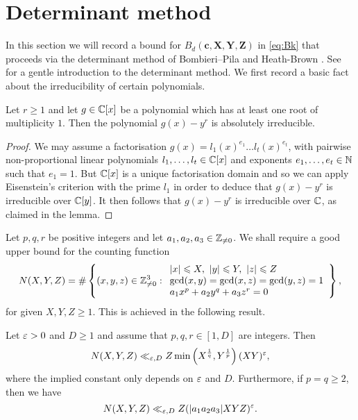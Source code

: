 \section{Determinant method}\label{s:det}

In this section we will record a bound for  $B_d(\mathbf{c},\mathbf{X},\mathbf{Y},\mathbf{Z})$  in  \eqref{eq:Bk} that proceeds via the determinant method of Bombieri--Pila \cite{bp} and Heath-Brown \cite{cime}. See \cite{bl} for a gentle introduction to the determinant method.
We first record a  basic fact about the irreducibility of certain polynomials.

\begin{lemma}\label{eis}
Let $r\geq 1$ and let $g\in \mathbb{C}[x]$ be a polynomial
which has  at least one root of multiplicity $1$.
Then the polynomial $g(x)-y^r$ is absolutely irreducible.
\end{lemma}

\begin{proof}
We may assume  a factorisation
 $g(x)=l_1(x)^{e_1}\dots l_t(x)^{e_t}$, with
pairwise non-proportional linear polynomials $l_1,\dots,l_t\in \mathbb{C}[x]$ and exponents $e_1,\dots,e_t\in \mathbb{N}$ such that
$e_1=1$.  But  ${\mathbb{C}}[x]$ is a unique factorisation domain and so we can apply Eisenstein's criterion
with the prime $l_1$ in order
to deduce that
$g(x)-y^r$ is  irreducible over $ {\mathbb{C}}[y]$. It then follows that
$g(x)-y^r$ is  irreducible over $ \mathbb{C}$, as claimed in the lemma.
\end{proof}




Let $p,q,r$ be positive integers and let  $a_1,a_2,a_3\in \mathbb{Z}_{\neq 0}$.
We shall require a good upper bound for the counting function
$$
N(X,Y,Z)=
\#\left\{ (x,y,z)\in \mathbb{Z}_{\neq 0}^3:
\begin{array}{l}
|x|\leqslant X, ~|y|\leqslant Y,~|z|\leqslant Z\\
\gcd(x,y)=\gcd(x,z)=\gcd(y,z)=1	\\
a_1x^p+a_2 y^q+a_3 z^r=0
\end{array}
\right\},
$$
for given $X,Y,Z\geq 1$.   This is achieved in the following  result.

\begin{lemma}\label{lem:t15}
Let $\varepsilon>0$ and $D\geq 1$ and
assume that  $p,q,r\in [1,D]$ are integers. Then
$$
N(X,Y,Z)\ll_{\varepsilon,D} Z \min\left(X^{\frac{1}{q}}, Y^{\frac{1}{p}} \right) (XY)^\varepsilon,
$$
where the implied constant only depends on $\varepsilon$ and $D$. Furthermore,
if $p=q\geq 2$,
then we have
$$
N(X,Y,Z)\ll_{\varepsilon,D} Z (|a_1a_2a_3|XYZ)^\varepsilon.
$$
\end{lemma}


